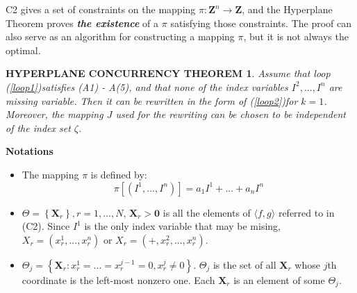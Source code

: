 C2 gives a set of constraints on the mapping $\pi: \mathbf{Z}^n \rightarrow \mathbf{Z}$,
and the Hyperplane Theorem proves \textit{\textbf{the existence}} of a $\pi$
satisfying those constraints. The proof can also serve as an algorithm for
constructing a mapping $\pi$, but it is not always the optimal.

\newtheorem*{theorem}{HYPERPLANE CONCURRENCY THEOREM}\label{hh}

\begin{theorem}
Assume that loop (\ref {loop1})satisfies (A1) - A(5), and that none of the
index variables {\color{red}$I^2, ..., I^n$} are missing variable. Then it
can be rewritten in the form of (\ref {loop2})for $k = 1$. Moreover, the mapping
$J$ used for the rewriting can be chosen to be independent of the index set $\zeta$.
\end{theorem}

\textbf{Notations}
\begin{itemize}
\item The mapping $\pi$ is defined by:
    $$\pi[(I^1, ...,I^n)] = a_1I^1 + ... + a_nI^n$$
\item $\mathcal{\Theta} = \left\{\mathbf{X}_r\right\},r = 1,...,N$,
$\mathbf{X}_r > \mathbf{0}$ is all the elements of $\langle f, g \rangle$
referred to in (C2). Since $I^1$ is the only index variable that may be mising,
$X_r = (x_r^1,...,x_r^n)$ or $X_r = (+,x_r^2,...,x_r^n)$.
\item $\mathcal{\Theta}_j = \left\{\mathbf{X}_r: x_r^1=...=x_r^{j-1}=0,x_r^j \ne 0 \right\}$.
$\mathcal{\Theta}_j$ is the set of all $\mathbf{X}_r$ whose $j$th
coordinate is the left-most nonzero one. Each $\mathbf{X}_r$ is an element of some
$\mathcal{\Theta}_j$.
\end{itemize}

